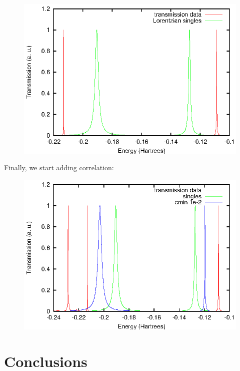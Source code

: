 \begin{figure}
	\begin{center}
		\includegraphics[width=0.9\linewidth]{figures/singles}
	\end{center}
	\caption{}
	\label{fig:singles}
\end{figure}

Finally, we start adding correlation:

\begin{figure}
	\begin{center}
		\includegraphics[width=0.9\linewidth]{figures/1em2}
	\end{center}
	\caption{}
	\label{fig:1em2}
\end{figure}

\section{Conclusions}
\label{sec:conclusions}

